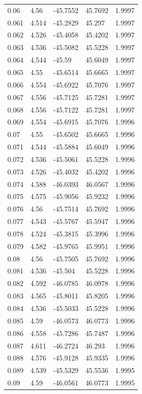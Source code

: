 \begin{tabular}{lllll}
0.06 & 4.56 & -45.7552 & 45.7692 & 1.9997 \\
0.061 & 4.514 & -45.2829 & 45.297 & 1.9997 \\
0.062 & 4.526 & -45.4058 & 45.4202 & 1.9997 \\
0.063 & 4.536 & -45.5082 & 45.5228 & 1.9997 \\
0.064 & 4.544 & -45.59 & 45.6049 & 1.9997 \\
0.065 & 4.55 & -45.6514 & 45.6665 & 1.9997 \\
0.066 & 4.554 & -45.6922 & 45.7076 & 1.9997 \\
0.067 & 4.556 & -45.7125 & 45.7281 & 1.9997 \\
0.068 & 4.556 & -45.7122 & 45.7281 & 1.9997 \\
0.069 & 4.554 & -45.6915 & 45.7076 & 1.9996 \\
0.07 & 4.55 & -45.6502 & 45.6665 & 1.9996 \\
0.071 & 4.544 & -45.5884 & 45.6049 & 1.9996 \\
0.072 & 4.536 & -45.5061 & 45.5228 & 1.9996 \\
0.073 & 4.526 & -45.4032 & 45.4202 & 1.9996 \\
0.074 & 4.588 & -46.0393 & 46.0567 & 1.9996 \\
0.075 & 4.575 & -45.9056 & 45.9232 & 1.9996 \\
0.076 & 4.56 & -45.7514 & 45.7692 & 1.9996 \\
0.077 & 4.543 & -45.5767 & 45.5947 & 1.9996 \\
0.078 & 4.524 & -45.3815 & 45.3996 & 1.9996 \\
0.079 & 4.582 & -45.9765 & 45.9951 & 1.9996 \\
0.08 & 4.56 & -45.7505 & 45.7692 & 1.9996 \\
0.081 & 4.536 & -45.504 & 45.5228 & 1.9996 \\
0.082 & 4.592 & -46.0785 & 46.0978 & 1.9996 \\
0.083 & 4.565 & -45.8011 & 45.8205 & 1.9996 \\
0.084 & 4.536 & -45.5033 & 45.5228 & 1.9996 \\
0.085 & 4.59 & -46.0573 & 46.0773 & 1.9996 \\
0.086 & 4.558 & -45.7286 & 45.7487 & 1.9996 \\
0.087 & 4.611 & -46.2724 & 46.293 & 1.9996 \\
0.088 & 4.576 & -45.9128 & 45.9335 & 1.9996 \\
0.089 & 4.539 & -45.5329 & 45.5536 & 1.9995 \\
0.09 & 4.59 & -46.0561 & 46.0773 & 1.9995 \\

\end{tabular}
